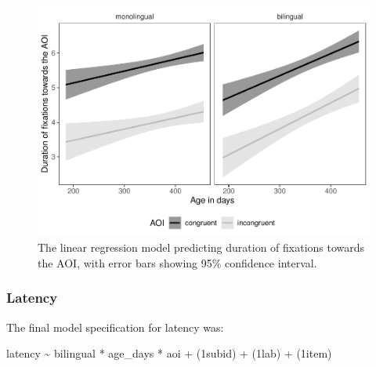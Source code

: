 \documentclass[
  english,
  ,man,floatsintext]{apa6}
\begin{document}
\begin{figure}
\centering
\includegraphics{gaze-following-paper_files/figure-latex/fig8-1.pdf}
\caption{\label{fig:fig8}The linear regression model predicting duration of fixations towards the AOI, with error bars showing 95\% confidence interval.}
\end{figure}

\hypertarget{latency-2}{%
\subsubsection{Latency}\label{latency-2}}

The final model specification for latency was:

latency \textasciitilde{} bilingual * age\_days * aoi +
(1\textbar subid) +
(1\textbar lab) +
(1\textbar item)
\end{document}
